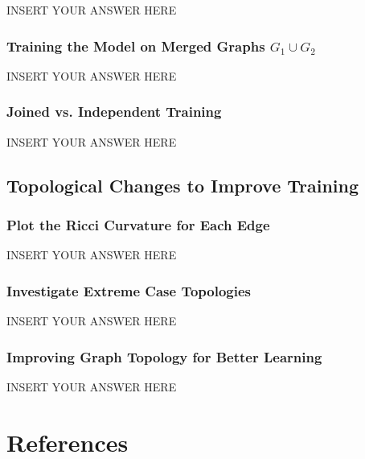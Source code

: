 \documentclass[a4paper,12pt]{article}
\begin{document}
INSERT YOUR ANSWER HERE


\subsubsection{Training the Model on Merged Graphs $G_1 \cup G_2$}

INSERT YOUR ANSWER HERE


\subsubsection{Joined vs. Independent Training}

INSERT YOUR ANSWER HERE


\subsection{Topological Changes to Improve Training}

\subsubsection{Plot the Ricci Curvature for Each Edge}

INSERT YOUR ANSWER HERE


\subsubsection{Investigate Extreme Case Topologies}

INSERT YOUR ANSWER HERE


\subsubsection{Improving Graph Topology for Better Learning}

INSERT YOUR ANSWER HERE



\section{References}


\end{document}
